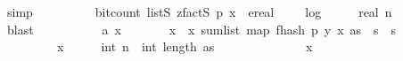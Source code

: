 \begin{isabellebody}
\ simp\isanewline
\ \ \ \ \ \ \isamarkupfalse%
\ \isamarkupfalse%
\ {\isachardoublequoteopen}bit{\isacharunderscore}{\kern0pt}count\ {\isacharparenleft}{\kern0pt}list\isactrlsub S\ {\isacharparenleft}{\kern0pt}zfact\isactrlsub S\ p{\isacharparenright}{\kern0pt}\ x{\isacharparenright}{\kern0pt}\ {\isasymle}\ ereal\ {\isacharparenleft}{\kern0pt}{}\ {\isacharplus}{\kern0pt}\ {}\ {\isacharasterisk}{\kern0pt}\ log\ {}\ {\isacharparenleft}{\kern0pt}{}\ {\isacharplus}{\kern0pt}\ {}\ {\isacharasterisk}{\kern0pt}\ real\ n{\isacharparenright}{\kern0pt}{\isacharparenright}{\kern0pt}{\isachardoublequoteclose}\isanewline
\ \ \ \ \ \ \ \ \isamarkupfalse%
\ blast\isanewline
\ \ \ \ \isamarkupfalse%
\isanewline
\isanewline
\ \ \ \ \isamarkupfalse%
\ a{\isacharunderscore}{\kern0pt}{}{\isacharcolon}{\kern0pt}\ {\isachardoublequoteopen}{\isasymAnd}x{\isachardot}{\kern0pt}\ \isanewline
\ \ \ \ \ \ x\ {\isasymin}\ {\isacharparenleft}{\kern0pt}{\isasymlambda}x{\isachardot}{\kern0pt}\ sum{\isacharunderscore}{\kern0pt}list\ {\isacharparenleft}{\kern0pt}map\ {\isacharparenleft}{\kern0pt}f{}{\isacharunderscore}{\kern0pt}hash\ p\ {\isacharparenleft}{\kern0pt}y\ x{\isacharparenright}{\kern0pt}{\isacharparenright}{\kern0pt}\ as{\isacharparenright}{\kern0pt}{\isacharparenright}{\kern0pt}\ {\isacharbackquote}{\kern0pt}\ {\isacharparenleft}{\kern0pt}{\isacharbraceleft}{\kern0pt}{}{\isachardot}{\kern0pt}{\isachardot}{\kern0pt}{\isacharless}{\kern0pt}s\ {\isasymtimes}\ {\isacharbraceleft}{\kern0pt}{}{\isachardot}{\kern0pt}{\isachardot}{\kern0pt}{\isacharless}{\kern0pt}s\ {\isasymLongrightarrow}\isanewline
\ \ \ \ \ \ \ \ \ {\isasymbar}x{\isasymbar}\ {\isasymle}\ {\isacharparenleft}{\kern0pt}{}\ {\isacharplus}{\kern0pt}\ {}\ {\isacharasterisk}{\kern0pt}\ int\ n{\isacharparenright}{\kern0pt}\ {\isacharasterisk}{\kern0pt}\ int\ {\isacharparenleft}{\kern0pt}length\ as{\isacharparenright}{\kern0pt}{\isachardoublequoteclose}\isanewline
\ \ \ \ \isamarkupfalse%
\ {\isacharminus}{\kern0pt}\isanewline
\ \ \ \ \ \ \isamarkupfalse%
\ x\isanewline
\ \ \ \ \ \ \isamarkupfalse%

\end{isabellebody}
